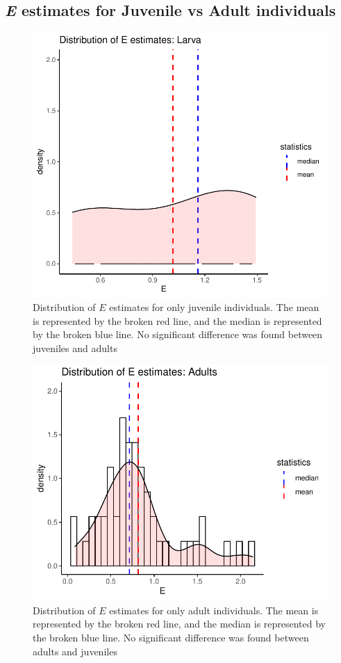 \documentclass{article}
\begin{document}
\subsection{\emph{E} estimates for Juvenile vs Adult individuals}
\begin{figure}[h]
    \centering
    \includegraphics[width=6in]{larva.pdf}
    \caption{\label{fig:S3} Distribution of \emph{$E$} estimates for only juvenile individuals. The mean is represented by the broken red line, and the median is represented by the broken blue line. No significant difference was found between juveniles and adults}
\end{figure}

\begin{figure}[h]
    \centering
    \includegraphics[width=6in]{adult.pdf}
    \caption{\label{fig:S4} Distribution of \emph{$E$} estimates for only adult individuals. The mean is represented by the broken red line, and the median is represented by the broken blue line. No significant difference was found between adults and juveniles}
\end{figure}
\end{document}

